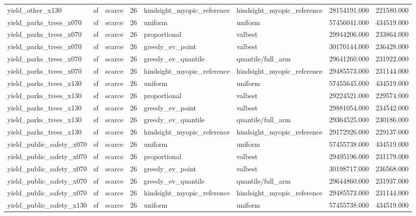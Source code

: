 \begin{tabular}{lllrllrr}
yield\_other\_x130 & sf & scarce & 26 & hindsight\_myopic\_reference & hindsight\_myopic\_reference & 28154191.000 & 221580.000 \\
yield\_parks\_trees\_x070 & sf & scarce & 26 & uniform & uniform & 57456041.000 & 434519.000 \\
yield\_parks\_trees\_x070 & sf & scarce & 26 & proportional & valbest & 29944206.000 & 233864.000 \\
yield\_parks\_trees\_x070 & sf & scarce & 26 & greedy\_ev\_point & valbest & 30170144.000 & 236428.000 \\
yield\_parks\_trees\_x070 & sf & scarce & 26 & greedy\_ev\_quantile & quantile/full\_arm & 29641260.000 & 231922.000 \\
yield\_parks\_trees\_x070 & sf & scarce & 26 & hindsight\_myopic\_reference & hindsight\_myopic\_reference & 29485573.000 & 231144.000 \\
yield\_parks\_trees\_x130 & sf & scarce & 26 & uniform & uniform & 57455645.000 & 434519.000 \\
yield\_parks\_trees\_x130 & sf & scarce & 26 & proportional & valbest & 29224521.000 & 229574.000 \\
yield\_parks\_trees\_x130 & sf & scarce & 26 & greedy\_ev\_point & valbest & 29881054.000 & 234542.000 \\
yield\_parks\_trees\_x130 & sf & scarce & 26 & greedy\_ev\_quantile & quantile/full\_arm & 29364525.000 & 230186.000 \\
yield\_parks\_trees\_x130 & sf & scarce & 26 & hindsight\_myopic\_reference & hindsight\_myopic\_reference & 29172926.000 & 229137.000 \\
yield\_public\_safety\_x070 & sf & scarce & 26 & uniform & uniform & 57455738.000 & 434519.000 \\
yield\_public\_safety\_x070 & sf & scarce & 26 & proportional & valbest & 29495196.000 & 231179.000 \\
yield\_public\_safety\_x070 & sf & scarce & 26 & greedy\_ev\_point & valbest & 30198717.000 & 236568.000 \\
yield\_public\_safety\_x070 & sf & scarce & 26 & greedy\_ev\_quantile & quantile/full\_arm & 29644860.000 & 231937.000 \\
yield\_public\_safety\_x070 & sf & scarce & 26 & hindsight\_myopic\_reference & hindsight\_myopic\_reference & 29485573.000 & 231144.000 \\
yield\_public\_safety\_x130 & sf & scarce & 26 & uniform & uniform & 57455738.000 & 434519.000 \\

\end{tabular}
